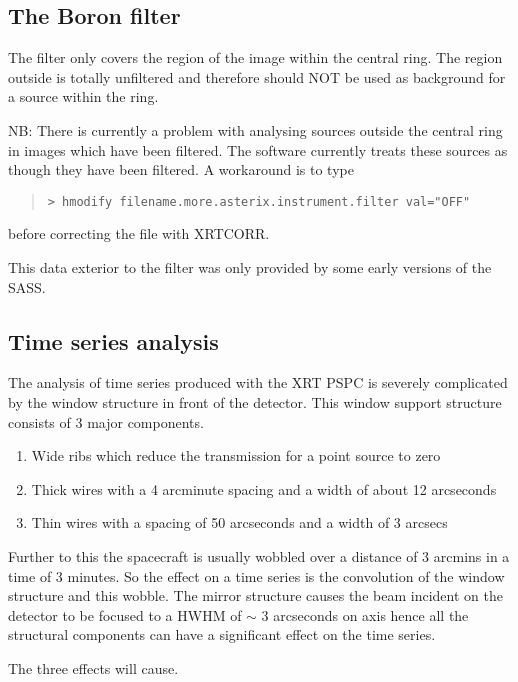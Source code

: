 \documentclass{book}
\renewcommand{\_}{{\tt\char'137}}     %
\begin{document}
\subsection{The Boron filter}
The filter only covers the region of the image within the central ring.
The region outside is totally unfiltered and therefore
should NOT be used as background for a source within the ring.
 
NB: There is currently a problem with analysing sources outside
the central ring in images which have been filtered. The software
currently treats these sources as though they have been filtered.
A workaround is to type
\begin{quote}\begin{verbatim}
> hmodify filename.more.asterix.instrument.filter val="OFF"
\end{verbatim}\end{quote}
before correcting the file with XRTCORR.
 
This data exterior to the filter was only provided by some early versions of
the SASS.
 
\subsection{Time series analysis}
The analysis of time series produced with the XRT PSPC is severely
complicated by the window structure in front of the detector.
This window support structure consists of 3 major components.
 
\begin{enumerate}
\item Wide ribs which reduce the transmission for a point source to zero
\item Thick wires with a 4 arcminute spacing and a width of about 12
arcseconds
\item Thin wires with a spacing of 50 arcseconds and a width of 3 arcsecs
\end{enumerate}
Further to this the spacecraft is usually wobbled over a distance of 3
arcmins in a time of 3 minutes. So the effect on a time series is the
convolution of the window structure and this wobble. The mirror structure
causes the beam incident on the detector to be focused to a HWHM of $\sim$ 3
arcseconds on axis hence all the structural components can have a
significant effect on the time series.
 
The three effects will cause.
 
\end{document}
